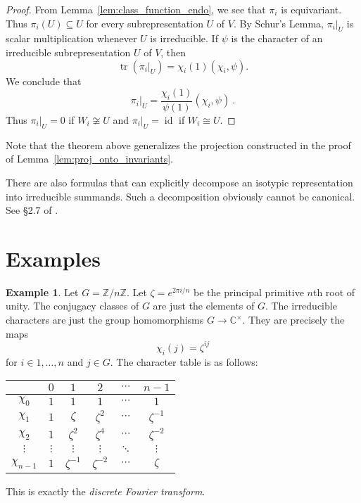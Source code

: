 \documentclass[12pt]{article}
\theoremstyle{plain}
\theoremstyle{definition}
\newtheorem{example}[theorem]{Example}
\theoremstyle{remark}
\numberwithin{equation}{section}
\begin{document}
\begin{proof}
From Lemma~\ref{lem:class_function_endo}, we see that
$\pi_i$ is equivariant.
Thus $\pi_i(U) \subseteq U$ for every subrepresentation $U$ of $V$.
By Schur's Lemma, $\pi_i|_U$ is scalar multiplication whenever
$U$ is irreducible.
If $\psi$ is the character of an irreducible subrepresentation $U$ of $V$,
then
\[
\operatorname{tr}(\pi_i|_U)=\chi_i(1) ( \chi_i, \psi ) .
\]
We conclude that
\[
\pi_i|_U = \frac{\chi_i(1)}{\psi(1)} ( \chi_i, \psi ) \ .
\]
Thus $\pi_i|_U=0$ if $W_i \not\cong U$ and $\pi_i|_U=\operatorname{id}$
if $W_i \cong U$.
\end{proof}

Note that the theorem above generalizes the projection constructed in
the proof of Lemma~\ref{lem:proj_onto_invariants}.

There are also formulas that can explicitly decompose an
isotypic representation into irreducible summands.
Such a decomposition obviously cannot be canonical.
See \S 2.7 of \cite{Serre}.

\newpage

\section{Examples}

\begin{example}
Let $G = \mathbb{Z}/n\mathbb{Z}$.  Let $\zeta = e^{2\pi i/n}$
be the principal primitive $n$th root of unity.
The conjugacy classes of $G$ are just the elements of $G$.
The irreducible characters are just
the group homomorphisms $G \to \mathbb{C}^\times$.
They are precisely the maps
\[
\chi_i(j) = \zeta^{ij}
\]
for $i \in 1,\ldots,n$ and $j \in G$.
The character table is as follows:
\begin{center}
\begin{tabular}{|c|c|c|c|c|c|}
\hline 
 & $0 $ & $1$ & $2$ & $\cdots$ & ${n-1}$\\
\hline 
\hline 
$\chi_0$ & $1$ & $1$ & $1$ & $\cdots$ & $1$\\
\hline 
$\chi_1$ & $1$ & $\zeta$ & $\zeta^2$ & $\cdots$ & $\zeta^{-1}$\\
\hline 
$\chi_2$ & $1$ & $\zeta^2$ & $\zeta^4$ & $\cdots$ & $\zeta^{-2}$\\
\hline 
$\vdots$ & $\vdots$ & $\vdots$ & $\vdots$ & $\ddots$ & $\vdots$\\
\hline 
$\chi_{n-1}$ & $1$ & $\zeta^{-1}$ & $\zeta^{-2}$ & $\cdots$ & $\zeta$\\
\hline
\end{tabular}
\end{center}
This is exactly the \emph{discrete Fourier transform}.
\end{example}
\end{document}
